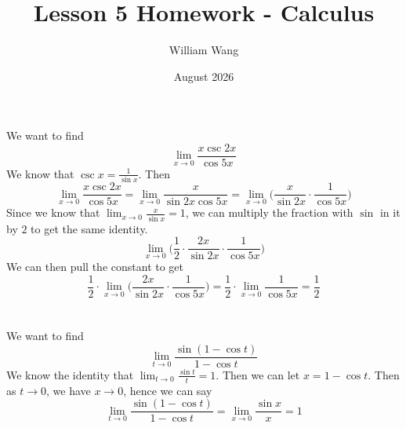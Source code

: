 \documentclass{article}
\title{Lesson 5 Homework - Calculus}
\author{William Wang}
\date{August 2026}
\begin{document}
\maketitle

\section{}
We want to find 
\[\lim_{x\to0}\frac{x\csc2x}{\cos 5x}\]
We know that \(\csc x = \frac{1}{\sin x}\). Then
\[\lim_{x\to0}\frac{x\csc2x}{\cos 5x} = \lim_{x\to0} \frac{x}{\sin 2x \cos 5x} = \lim_{x\to0} \biggl(\frac{x}{\sin 2x} \cdot \frac{1}{\cos 5x}\biggl)\]
Since we know that \(\lim_{x\to 0} \frac{x}{\sin x} =1\), we can multiply the fraction with \(\sin\) in it by \(2\) to get the same identity. 
\[\lim_{x\to0} \biggl (\frac{1}{2}\cdot\frac{2x}{\sin 2x} \cdot \frac{1}{\cos 5x}\biggl )\]
We can then pull the constant to get 
\[\frac{1}{2}\cdot \lim_{x\to0}\biggl( \frac{2x}{\sin 2x}\cdot \frac{1}{\cos 5x} \biggl) = \frac{1}{2} \cdot \lim_{x\to0}\frac{1}{\cos 5x} = \frac{1}{2}\]

\section{}
We want to find 
\[\lim_{t\to 0} \frac{\sin(1-\cos t)}{1-\cos t}\]
We know the identity that \(\lim_{t\to0} \frac{\sin t}{t} = 1\). Then we can let \(x = 1-\cos t\). Then as \(t\to 0\), we have \(x\to 0\), hence we can say
\[\lim_{t\to0} \frac{\sin(1-\cos t)}{1-\cos t} = \lim_{x\to0}\frac{\sin x}{x} = 1\]
\end{document}
